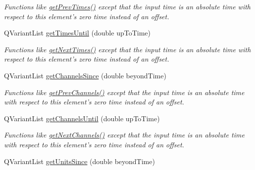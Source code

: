 \begin{DoxyCompactItemize}
\begin{DoxyCompactList}\small\item\em Functions like \hyperlink{class_picto_1_1_analysis_spike_data_a486d3e1e4eb7989b7cde62012b55a7dd}{get\-Prev\-Times()} except that the input time is an absolute time with respect to this element's zero time instead of an offset. \end{DoxyCompactList}\item 
\hypertarget{class_picto_1_1_analysis_spike_data_aa3f5dee42c7e016a433fb64af074557e}{Q\-Variant\-List \hyperlink{class_picto_1_1_analysis_spike_data_aa3f5dee42c7e016a433fb64af074557e}{get\-Times\-Until} (double up\-To\-Time)}\label{class_picto_1_1_analysis_spike_data_aa3f5dee42c7e016a433fb64af074557e}

\begin{DoxyCompactList}\small\item\em Functions like \hyperlink{class_picto_1_1_analysis_spike_data_ae0829d9e6cde9e3c80f86f95beb48543}{get\-Next\-Times()} except that the input time is an absolute time with respect to this element's zero time instead of an offset. \end{DoxyCompactList}\item 
\hypertarget{class_picto_1_1_analysis_spike_data_a9b6364e43eba4f798e03d3dec2a379c3}{Q\-Variant\-List \hyperlink{class_picto_1_1_analysis_spike_data_a9b6364e43eba4f798e03d3dec2a379c3}{get\-Channels\-Since} (double beyond\-Time)}\label{class_picto_1_1_analysis_spike_data_a9b6364e43eba4f798e03d3dec2a379c3}

\begin{DoxyCompactList}\small\item\em Functions like \hyperlink{class_picto_1_1_analysis_spike_data_aa1122c333d6dc3199879ac5f9262e859}{get\-Prev\-Channels()} except that the input time is an absolute time with respect to this element's zero time instead of an offset. \end{DoxyCompactList}\item 
\hypertarget{class_picto_1_1_analysis_spike_data_a1970220748e3b0d46731f9fe43adfc34}{Q\-Variant\-List \hyperlink{class_picto_1_1_analysis_spike_data_a1970220748e3b0d46731f9fe43adfc34}{get\-Channels\-Until} (double up\-To\-Time)}\label{class_picto_1_1_analysis_spike_data_a1970220748e3b0d46731f9fe43adfc34}

\begin{DoxyCompactList}\small\item\em Functions like \hyperlink{class_picto_1_1_analysis_spike_data_a403275bcc56f351df1290dffb4dd2a19}{get\-Next\-Channels()} except that the input time is an absolute time with respect to this element's zero time instead of an offset. \end{DoxyCompactList}\item 
\hypertarget{class_picto_1_1_analysis_spike_data_a58ba542f9c99d0e6d720d8174a756dcb}{Q\-Variant\-List \hyperlink{class_picto_1_1_analysis_spike_data_a58ba542f9c99d0e6d720d8174a756dcb}{get\-Units\-Since} (double beyond\-Time)}\label{class_picto_1_1_analysis_spike_data_a58ba542f9c99d0e6d720d8174a756dcb}


\end{DoxyCompactItemize}
